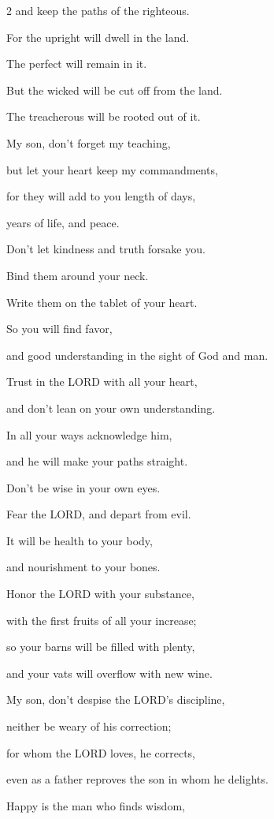\begin{multicols}{2}
and keep the paths of the righteous.


\myverse{}For the upright will dwell in the land.

The perfect will remain in it.


\myverse{}But the wicked will be cut off from the land.

The treacherous will be rooted out of it.


\mychapter{} \myverse*{}My son, don’t forget my teaching,

but let your heart keep my commandments,


\myverse{}for they will add to you length of days,

years of life, and peace.


\myverse{}Don’t let kindness and truth forsake you.

Bind them around your neck.

Write them on the tablet of your heart.


\myverse{}So you will find favor,

and good understanding in the sight of God and man.


\myverse{}Trust in the LORD with all your heart,

and don’t lean on your own understanding.


\myverse{}In all your ways acknowledge him,

and he will make your paths straight.


\myverse{}Don’t be wise in your own eyes.

Fear the LORD, and depart from evil.


\myverse{}It will be health to your body,

and nourishment to your bones.


\myverse{}Honor the LORD with your substance,

with the first fruits of all your increase;


\myverse{}so your barns will be filled with plenty,

and your vats will overflow with new wine.


\myverse{}My son, don’t despise the LORD’s discipline,

neither be weary of his correction;


\myverse{}for whom the LORD loves, he corrects,

even as a father reproves the son in whom he delights.


\vspace{\baselineskip} 
\myverse{}Happy is the man who finds wisdom,


\end{multicols}

